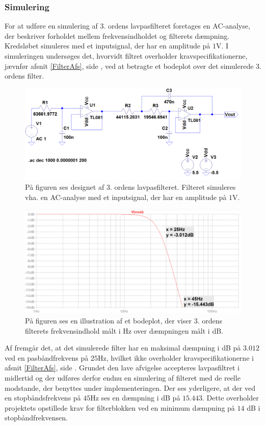 \subsubsection{Simulering}
For at udføre en simulering af $3$. ordens lavpasfilteret foretages en AC-analyse, der beskriver forholdet mellem frekvensindholdet og filterets dæmpning. Kredsløbet simuleres med et inputsignal, der har en amplitude på $1$V. I simuleringen undersøges det, hvorvidt filtret overholder kravspecifikationerne, jævnfør afsnit \ref{FilterAfs}, side \pageref{FilterAfs}, ved at betragte et bodeplot over det simulerede $3$. ordens filter.
\begin{figure}[H]
	\centering
	\includegraphics[scale=0.35]{figures/cProblemloesning/Lavpasfilter_LTspice.PNG}
	\caption{På figuren ses designet af $3$. ordens lavpasfilteret. Filteret simuleres vha. en AC-analyse med et inputsignal, der har en amplitude på $1$V.}
	\label{fig:lavpasfilter_LTspice}
\end{figure}
\begin{figure}[H]
	\centering
	\includegraphics[scale=0.38]{figures/cProblemloesning/Lavpasfiltergraf_LTspice2.PNG}
	\caption{På figuren ses en illustration af et bodeplot, der viser $3$. ordens filterets frekvensindhold målt i Hz over dæmpningen målt i dB.}
	\label{fig:lavpasfiltergraf_LTspice1}
\end{figure}
\noindent Af  fremgår det, at det simulerede filter har en maksimal dæmpning i dB på $3.012$ ved en pasbåndfrekvens på $25$Hz, hvilket ikke overholder kravspecifikationerne i afsnit \ref{FilterAfs}, side \pageref{FilterAfs}. Grundet den lave afvigelse accepteres lavpasfiltret i midlertid og der udføres derfor endnu en simulering af filteret med de reelle modstande, der benyttes under implementeringen. Der ses yderligere, at der ved en stopbåndsfrekvens på $45$Hz ses en dæmpning i dB på $15.443$. Dette overholder projektets opstillede krav for filterblokken ved en minimum dæmpning på $14$ dB i stopbåndfrekvensen.

